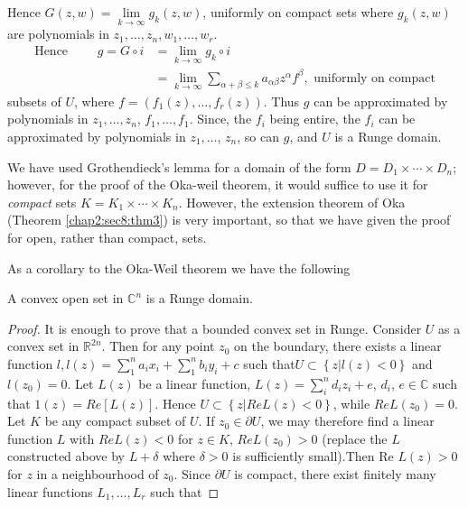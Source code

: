 Hence $G(z, w) = \lim \limits_{k \rightarrow \infty} g_k (z, w)$,
uniformly on compact sets where $g_k (z, w)$ are polynomials in $z_1,
\ldots , z_n, w_1,\ldots , w_r$. 
\begin{align*}
  \text{ Hence } \qquad g = G \circ i & = \lim_{k \rightarrow \infty} g_k \circ i \\
  & = \lim_{k \rightarrow \infty} \sum_{\alpha + \beta \leq
    k}a_{\alpha \beta} z^{\alpha} f^{\beta}, \text{ uniformly on
    compact } 
\end{align*} 
subsets of $U$, where $f = (f_1(z), \ldots , f_r (z))$. Thus $g$ can
be approximated by polynomials in $z_1, \ldots, z_n$, $f_1, \ldots,
f_1$. Since, the $f_i$ being entire, the $f_i$ can be approximated by
polynomials in $z_1, \ldots$, $z_n$, so can $g$, and $U$ is a Runge
domain. 

\begin{remark*}
  We have used Grothendieck's lemma for a domain of the form $D = D_1
  \times \cdots \times D_n$; however, for the proof of the Oka-weil
  theorem, it would suffice to use it for \textit{compact} sets $K =
  K_1 \times \cdots \times K_n$. However, the extension theorem of Oka
  (Theorem \ref{chap2:sec8:thm3}) is very important, so that we have given the proof for
  open, rather than compact, sets. 
\end{remark*} 
 
As a corollary to the Oka-Weil theorem we have the following 
\begin{proposition}\label{chap2:sec8:prop2} %
  A convex open set in $\mathbb{C}^n$ is a Runge domain.
\end{proposition}

\begin{proof}
  It is enough to prove that a bounded convex set in Runge. Consider
  $U$ as a convex set  in $\mathbb{R}^{2n}$. Then for any point $z_0$
  on the boundary, there exists a linear function $l, l(z) = \sum
  \limits^n_1 a_i x_i + \sum \limits^n_1 b_i y_i + c$ such that\pageoriginale $U
  \subset \left\{z \bigg| l (z) < 0 \right\}$ and $l(z_0) = 0$. Let $L(z)$ be a
  linear function, $L(z) = \sum \limits^n_i d_i z_i + e$, $d_i$, $e
  \in \mathbb{C}$ such that $1(z) = Re [ L(z)]$. Hence $U \subset \left\{ z
  \bigg| Re L(z) < 0 \right\}$, while $Re L(z_0) = 0$. Let $K$ be any compact
  subset of $U$. If $z_0 \in \partial U$, we may therefore find a
  linear function $L$ with $Re L(z) < 0$ for $z \in K$, $Re L(z_0) >
  0$ (replace the $L$ constructed above by $L + \delta$ where $\delta
  > 0$ is sufficiently small).Then Re $L(z) > 0$ for $z$ in a
  neighbourhood of $z_0$. Since $\partial U$ is compact, there exist
  finitely many linear functions $L_1, \ldots , L_r$ such that 
\end{proof} 
 
